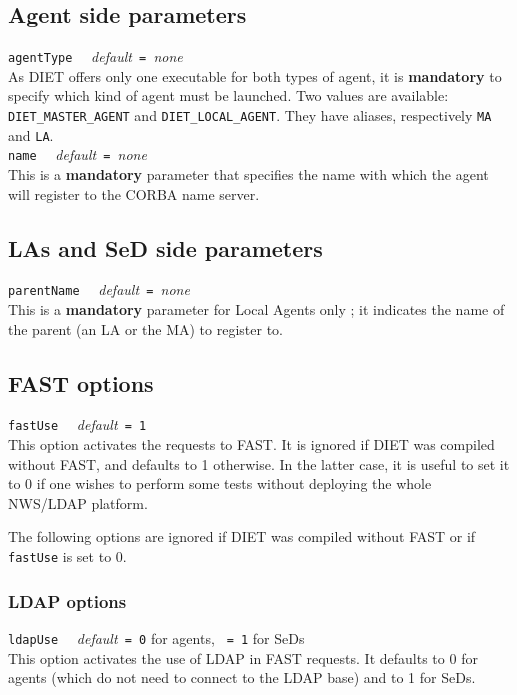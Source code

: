 \subsection{Agent side parameters}

\noindent
\texttt{agentType} \ \ \emph{default}\texttt{ = }\emph{none}\\
As DIET offers only one executable for both types of agent, it is
\textbf{mandatory} to specify which kind of agent must be launched. Two values
are available: \texttt{DIET\_MASTER\_AGENT} and \texttt{DIET\_LOCAL\_AGENT}.
They have aliases, respectively \texttt{MA} and \texttt{LA}.
\\

\noindent
\texttt{name} \ \ \emph{default}\texttt{ = }\emph{none}\\
This is a \textbf{mandatory} parameter that specifies the name with
which the agent will register to the CORBA name server.


\subsection{LAs and SeD side parameters}

\noindent
\texttt{parentName} \ \ \emph{default}\texttt{ = }\emph{none}\\
This is a \textbf{mandatory} parameter for Local Agents only ; it indicates the
name of the parent (an LA or the MA) to register to.


\subsection{FAST options}

\noindent
\texttt{fastUse} \ \ \emph{default}\texttt{ = 1}\\
This option activates the requests to FAST. It is ignored if DIET was
compiled without FAST, and defaults to 1 otherwise. In the latter case, it is
useful to set it to 0 if one wishes to perform some tests
without deploying the whole NWS/LDAP platform.

The following options are ignored if DIET was compiled without FAST or if
\texttt{fastUse} is set to 0.

\subsubsection{LDAP options}

\noindent
\texttt{ldapUse} \ \ \emph{default}\texttt{ = 0} for agents, \texttt{ = 1} for
SeDs\\
This option activates the use of LDAP in FAST requests. It defaults to 0 for
agents (which do not need to connect to the LDAP base) and to 1 for SeDs.
\\

